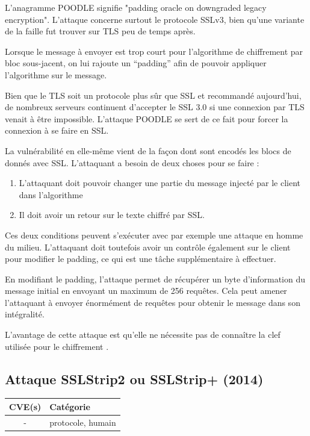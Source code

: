 L'anagramme POODLE signifie "padding oracle on downgraded legacy encryption". L'attaque concerne surtout le protocole SSLv3, bien qu'une variante de la faille fut trouver sur TLS peu de temps après.

Lorsque le message à envoyer est trop court pour l'algorithme de chiffrement par bloc sous-jacent, on lui rajoute un ``padding'' afin de pouvoir appliquer l'algorithme sur le message.

Bien que le TLS soit un protocole plus sûr que SSL et recommandé aujourd'hui, de nombreux serveurs continuent d'accepter le SSL 3.0 si une connexion par TLS venait à être impossible. L'attaque POODLE se sert de ce fait pour forcer la connexion à se faire en SSL.

La vulnérabilité en elle-même vient de la façon dont sont encodés les blocs de donnés avec SSL. L'attaquant a besoin de deux choses pour se faire :

\begin{enumerate}
    \item L'attaquant doit pouvoir changer une partie du message injecté par le client dans l'algorithme
    \item Il doit avoir un retour sur le texte chiffré par SSL.
\end{enumerate}

Ces deux conditions peuvent s'exécuter avec par exemple une attaque en homme du milieu. L'attaquant doit toutefois avoir un contrôle également sur le client pour modifier le padding, ce qui est une tâche supplémentaire à effectuer.

En modifiant le padding, l'attaque permet de récupérer un byte d'information du message initial en envoyant un maximum de 256 requêtes. Cela peut amener l'attaquant à envoyer énormément de requêtes pour obtenir le message dans son intégralité.

L'avantage de cette attaque est qu'elle ne nécessite pas de connaître la clef utilisée pour le chiffrement \cite{poodle}.



\subsection{Attaque SSLStrip2 ou SSLStrip+ (2014)}

\begin{tabularx}{0.96\textwidth}{|c|X|}
  \hline
  \textbf{CVE(s)} & \textbf{Catégorie} \\
  \hline
  - & protocole, humain \\
  \hline
\end{tabularx}

